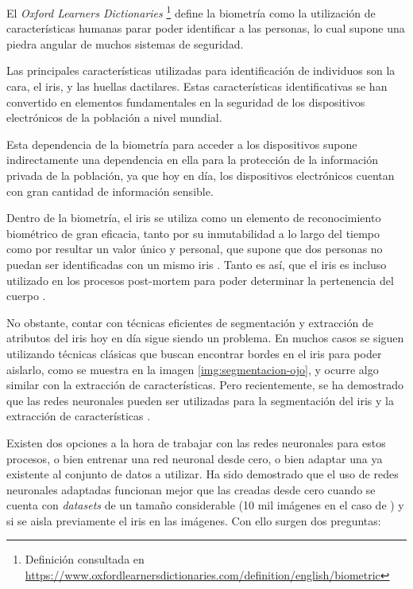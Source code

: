  \label{capitulo1}

El \textit{Oxford Learners Dictionaries} \footnote{Definición consultada en \url{https://www.oxfordlearnersdictionaries.com/definition/english/biometric}} define la biometría como la utilización de características humanas parar poder identificar a las personas, lo cual supone una piedra angular de muchos sistemas de seguridad.

Las principales características utilizadas para identificación de individuos son la cara, el iris, y las huellas dactilares. Estas características identificativas se han convertido en elementos fundamentales en la seguridad de los dispositivos electrónicos de la población a nivel mundial. 

Esta dependencia de la biometría para acceder a los dispositivos supone indirectamente una dependencia en ella para la protección de la información privada de la población, ya que hoy en día, los dispositivos electrónicos cuentan con gran cantidad de información sensible.

Dentro de la biometría, el iris se utiliza como un elemento de reconocimiento biométrico de gran eficacia, tanto por su inmutabilidad a lo largo del tiempo como por resultar un valor único y 
personal, que supone que dos personas no puedan ser identificadas con un mismo iris \cite{malgheet_iris_2021}. Tanto es así, que el iris es incluso utilizado en los procesos 
post-mortem para poder determinar la pertenencia del cuerpo \cite{dd_post-mortem_2020}.

No obstante, contar con técnicas eficientes de segmentación y extracción de atributos del iris hoy en día sigue siendo un problema. En muchos casos se siguen utilizando técnicas clásicas que buscan encontrar bordes en el iris para poder aislarlo, como se muestra en la imagen \ref{img:segmentacion-ojo}, y ocurre algo similar con la extracción de características.
Pero recientemente, se ha demostrado que las redes neuronales pueden ser utilizadas para la segmentación del iris \cite{lozej_end--end_2018} y la extracción de características \cite{tfg_iris_2020}\cite{boyd_deep_2020}.

Existen dos opciones a la hora de trabajar con las redes neuronales para estos procesos, o bien entrenar una red neuronal desde cero, o bien adaptar una ya existente al conjunto de datos a utilizar. Ha sido demostrado que el uso de redes neuronales adaptadas funcionan mejor que las creadas desde cero cuando se cuenta con \textit{datasets} de un tamaño considerable (10 mil imágenes en el caso de \cite{boyd_deep_2020}) y si se aisla previamente el iris en las imágenes.
Con ello surgen dos preguntas:

